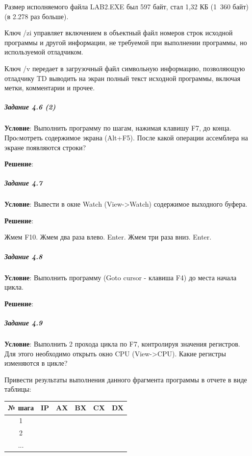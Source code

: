 Размер исполняемого файла LAB2.EXE был 597 байт, стал 1,32 КБ (1 360 байт) (в 2.278 раз больше).

Ключ /zi управляет включением в объектный файл номеров строк исходной программы и другой информации, не требуемой при выполнении программы, но используемой отладчиком.

Ключ /v передает в загрузочный файл символьную информацию, позволяющую отладчику TD выводить на экран полный текст исходной программы, включая метки, комментарии и прочее.







\subparagraph{Задание 4.6 (2)}

\textbf{Условие}:
Выполнить программу по шагам, нажимая клавишу F7, до конца. Проcмотреть содержимое экрана (Alt+F5). После какой операции ассемблера на экране появляются строки?
 
\textbf{Решение}:



\subparagraph{Задание 4.7}

\textbf{Условие}:
Вывести в окне Watch (View->Watch) содержимое выходного буфера. 

\textbf{Решение}:

Жмем F10. Жмем два раза влево. Enter. Жмем три раза вниз. Enter. 


\subparagraph{Задание 4.8}

\textbf{Условие}:
Выполнить программу (Goto cursor - клавиша F4) до места начала цикла. 

\textbf{Решение}:



\subparagraph{Задание 4.9}

\textbf{Условие}:
Выполнить 2 прохода цикла по F7, контролируя значения регистров. Для этого необходимо открыть окно CPU (View->CPU). Какие регистры изменяются в цикле?

Привести результаты выполнения данного фрагмента программы в отчете в виде таблицы:

\begin{table}[!ht]
   \centering

   \begin{tabular}{|c|c|c|c|c|c|} 
      \hline
      № шага  & IP  & AX  & BX  & CX  & DX  \\ \hline
      \hline
      1       &     &     &     &     &     \\ \hline
      2       &     &     &     &     &     \\ \hline
      ...     &     &     &     &     &     \\ \hline
   \end{tabular}
\end{table}

